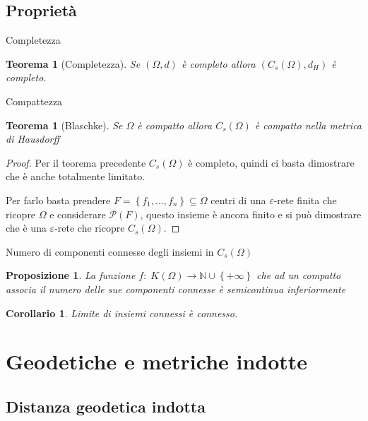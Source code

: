 \documentclass{beamer}
\newcounter{counter1}
\theoremstyle{plain}
\newtheorem{myteo}[counter1]{Teorema}
\newtheorem{mypro}[counter1]{Proposizione}
\newtheorem{mycor}[counter1]{Corollario}
\theoremstyle{definition}
\theoremstyle{remark}
\newcommand{\set}[1]{\left\{#1\right\}}
\newcommand{\pa}[1]{\left(#1\right)}
\begin{document}
\subsection{Proprietà}

\begin{frame}{Completezza}
  \begin{myteo}[Completezza]%
    Se $(\Omega,d)$ è completo allora $\pa{C_s(\Omega),d_H}$ è completo.
  \end{myteo}
\end{frame}

\begin{frame}{Compattezza}
  \begin{myteo}[Blaschke]%
    Se $\Omega$ è compatto allora $C_s(\Omega)$ è compatto nella metrica
    di Hausdorff
  \end{myteo}
  \begin{proof}
    Per il teorema precedente $C_s(\Omega)$ è completo, quindi ci basta
    dimostrare che è anche totalmente limitato.
    
    Per farlo basta prendere $F = \set{f_1,...,f_n} \subseteq \Omega$ centri
    di una $\varepsilon$-rete finita che ricopre $\Omega$ e considerare
    $\mathcal{P}(F)$, questo insieme è ancora finito e si può dimostrare
    che è una $\varepsilon$-rete che ricopre $C_s(\Omega)$.
  \end{proof}
\end{frame}

\begin{frame}{Numero di componenti connesse degli insiemi in
    $C_s(\Omega)$}
  \begin{mypro}
    La funzione $f:\; K(\Omega) \rightarrow \mathbb{N} \cup \set{+\infty}$
    che ad un compatto associa il numero delle sue componenti connesse è
    semicontinua inferiormente
  \end{mypro}
  \begin{mycor}
    Limite di insiemi connessi è connesso.
  \end{mycor}
\end{frame}

\section{Geodetiche e metriche indotte}

\subsection{Distanza geodetica indotta}
\end{document}
